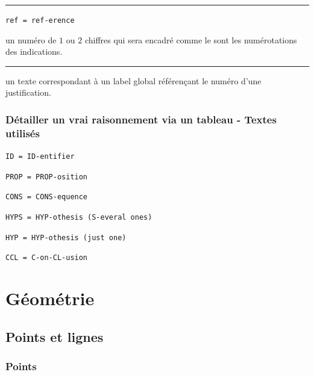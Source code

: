 \documentclass[12pt,a4paper]{book}
\theoremstyle{definition}
\newcommand\separation{
	\medskip
	\hfill\rule{0.5\textwidth}{0.75pt}\hfill
	\medskip
}
\newcommand\extraspace{
	\vspace{0.25em}
}
\newcommand\mwhyprefix[2]{%
	\texttt{#1 = #1-#2}%
}
\newcommand\prefix[1]{%
	\texttt{#1}%
}
\begin{document}
{{\separation


  \hfill \mwhyprefix{ref}{erence}

\IDarg{} un numéro de $1$ ou $2$ chiffres qui sera encadré comme le sont les numérotations des indications.


\separation



\IDarg{} un texte correspondant à un label global référençant le numéro d'une justification.


\subsubsection{Détailler un \og vrai \fg{} raisonnement via un tableau - Textes utilisés}

     \hfill \mwhyprefix{ID}{entifier}


   \hfill \mwhyprefix{PROP}{osition}

   \hfill \mwhyprefix{CONS}{equence}

\extraspace

   \hfill \prefix{HYPS = HYP-othesis (S-everal ones)} 

    \hfill \prefix{HYP = HYP-othesis (just one)}

    \hfill \prefix{CCL = C-on-CL-usion}

\extraspace









\section{Géométrie}

\subsection{Points et lignes}

\subsubsection{Points}




}}
\end{document}
